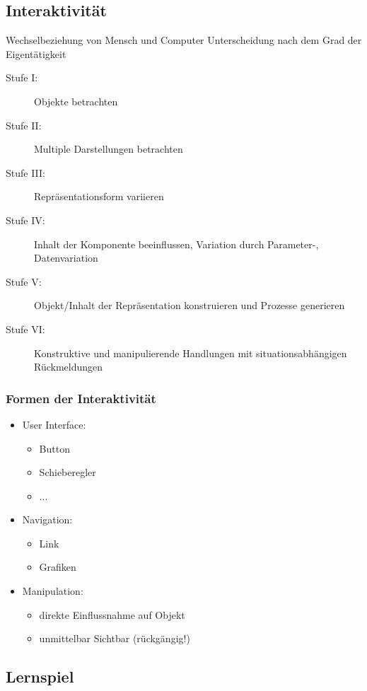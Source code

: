 \documentclass[a4paper]{article}
\begin{document}
\subsection{Interaktivität}
Wechselbeziehung von Mensch und Computer \textrightarrow Unterscheidung nach dem Grad der Eigentätigkeit
\begin{description}
	\item[Stufe I:] Objekte betrachten
	\item[Stufe II:] Multiple Darstellungen betrachten
	\item[Stufe III:] Repräsentationsform variieren
	\item[Stufe IV:] Inhalt der Komponente beeinflussen, Variation durch Parameter-, Datenvariation
	\item[Stufe V:] Objekt/Inhalt der Repräsentation konstruieren und Prozesse generieren
	\item[Stufe VI:] Konstruktive und manipulierende Handlungen mit situationsabhängigen Rückmeldungen
\end{description}

\subsubsection{Formen der Interaktivität}

\begin{itemize}
	\item User Interface:
	\begin{itemize}
		\item Button
		\item Schieberegler
		\item ...
	\end{itemize}
	\item Navigation:
	\begin{itemize}
		\item Link
		\item Grafiken
	\end{itemize}
	\item Manipulation:
	\begin{itemize}
		\item direkte Einflussnahme auf Objekt
		\item unmittelbar Sichtbar (rückgängig!)
	\end{itemize}
\end{itemize}

\subsection{Lernspiel}
\end{document}
